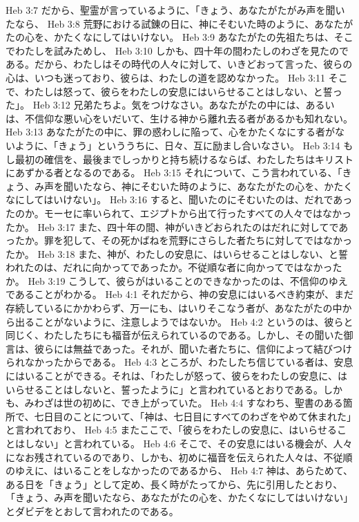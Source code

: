 Heb 3:7  だから、聖霊が言っているように、「きょう、あなたがたがみ声を聞いたなら、
Heb 3:8  荒野における試錬の日に、神にそむいた時のように、あなたがたの心を、かたくなにしてはいけない。
Heb 3:9  あなたがたの先祖たちは、そこでわたしを試みためし、
Heb 3:10  しかも、四十年の間わたしのわざを見たのである。だから、わたしはその時代の人々に対して、いきどおって言った、彼らの心は、いつも迷っており、彼らは、わたしの道を認めなかった。
Heb 3:11  そこで、わたしは怒って、彼らをわたしの安息にはいらせることはしない、と誓った」。
Heb 3:12  兄弟たちよ。気をつけなさい。あなたがたの中には、あるいは、不信仰な悪い心をいだいて、生ける神から離れ去る者があるかも知れない。
Heb 3:13  あなたがたの中に、罪の惑わしに陥って、心をかたくなにする者がないように、「きょう」といううちに、日々、互に励まし合いなさい。
Heb 3:14  もし最初の確信を、最後までしっかりと持ち続けるならば、わたしたちはキリストにあずかる者となるのである。
Heb 3:15  それについて、こう言われている、「きょう、み声を聞いたなら、神にそむいた時のように、あなたがたの心を、かたくなにしてはいけない」。
Heb 3:16  すると、聞いたのにそむいたのは、だれであったのか。モーセに率いられて、エジプトから出て行ったすべての人々ではなかったか。
Heb 3:17  また、四十年の間、神がいきどおられたのはだれに対してであったか。罪を犯して、その死かばねを荒野にさらした者たちに対してではなかったか。
Heb 3:18  また、神が、わたしの安息に、はいらせることはしない、と誓われたのは、だれに向かってであったか。不従順な者に向かってではなかったか。
Heb 3:19  こうして、彼らがはいることのできなかったのは、不信仰のゆえであることがわかる。
Heb 4:1  それだから、神の安息にはいるべき約束が、まだ存続しているにかかわらず、万一にも、はいりそこなう者が、あなたがたの中から出ることがないように、注意しようではないか。
Heb 4:2  というのは、彼らと同じく、わたしたちにも福音が伝えられているのである。しかし、その聞いた御言は、彼らには無益であった。それが、聞いた者たちに、信仰によって結びつけられなかったからである。
Heb 4:3  ところが、わたしたち信じている者は、安息にはいることができる。それは、「わたしが怒って、彼らをわたしの安息に、はいらせることはしないと、誓ったように」と言われているとおりである。しかも、みわざは世の初めに、でき上がっていた。
Heb 4:4  すなわち、聖書のある箇所で、七日目のことについて、「神は、七日目にすべてのわざをやめて休まれた」と言われており、
Heb 4:5  またここで、「彼らをわたしの安息に、はいらせることはしない」と言われている。
Heb 4:6  そこで、その安息にはいる機会が、人々になお残されているのであり、しかも、初めに福音を伝えられた人々は、不従順のゆえに、はいることをしなかったのであるから、
Heb 4:7  神は、あらためて、ある日を「きょう」として定め、長く時がたってから、先に引用したとおり、「きょう、み声を聞いたなら、あなたがたの心を、かたくなにしてはいけない」とダビデをとおして言われたのである。
